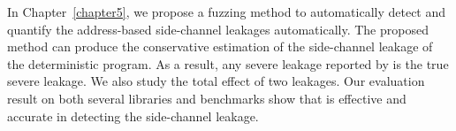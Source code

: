 In Chapter~\ref{chapter5}, we propose a fuzzing method to automatically detect and quantify the address-based side-channel leakages automatically. The proposed method can produce the conservative estimation of the side-channel leakage of the deterministic program. As a result, any severe leakage reported by \ctool{} is the true severe leakage. We also study the total effect of two leakages. Our evaluation result on both several libraries and benchmarks show that \ctool{} is effective and accurate in detecting the side-channel leakage.
